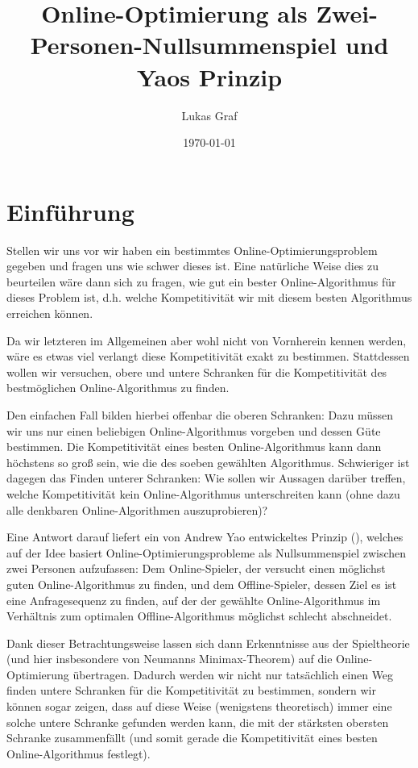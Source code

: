 \documentclass[a4paper,ngerman,12pt,bibtotoc]{scrartcl}
\theoremstyle{definition}
\theoremstyle{plain}
\theoremstyle{remark}
\renewcommand{\_}{\mathpunct{.}\,}
\newcommand{\?}{\,{:}\,}
\newcommand{\ZPNS}{Zwei-Personen-Nullsummenspiel }
\begin{document}
	\author{Lukas Graf}
	\title{Online-Optimierung als \ZPNS und Yaos Prinzip}
	\date{\today}
	
	\thispagestyle{empty}
	
	\maketitle

	\section*{Einführung}
	
	Stellen wir uns vor wir haben ein bestimmtes Online-Optimierungsproblem gegeben und fragen uns wie \glqq schwer\grqq{} dieses ist. Eine natürliche Weise dies zu beurteilen wäre dann sich zu fragen, wie gut ein bester Online-Algorithmus für dieses Problem ist, d.h. welche Kompetitivität wir mit diesem besten Algorithmus erreichen können.
	
	Da wir letzteren im Allgemeinen aber wohl nicht von Vornherein kennen werden, wäre es etwas viel verlangt diese Kompetitivität exakt zu bestimmen. Stattdessen wollen wir versuchen, obere und untere Schranken für die Kompetitivität des bestmöglichen Online-Algorithmus zu finden. 
	
	Den einfachen Fall bilden hierbei offenbar die oberen Schranken: Dazu müssen wir uns nur einen beliebigen Online-Algorithmus vorgeben und dessen Güte bestimmen. Die Kompetitivität eines besten Online-Algorithmus kann dann höchstens so groß sein, wie die des soeben gewählten Algorithmus. Schwieriger ist dagegen das Finden unterer Schranken: Wie sollen wir Aussagen darüber treffen, welche Kompetitivität kein Online-Algorithmus unterschreiten kann (ohne dazu alle denkbaren Online-Algorithmen auszuprobieren)?
	
	Eine Antwort darauf liefert ein von Andrew Yao entwickeltes Prinzip (\cite*[Theorem 1]{Yao}), welches auf der Idee basiert Online-Optimierungsprobleme als Nullsummenspiel zwischen zwei Personen aufzufassen: Dem Online-Spieler, der versucht einen möglichst guten Online-Algorithmus zu finden, und dem Offline-Spieler, dessen Ziel es ist eine Anfragesequenz zu finden, auf der der gewählte Online-Algorithmus im Verhältnis zum optimalen Offline-Algorithmus möglichst schlecht abschneidet.
	
	Dank dieser Betrachtungsweise lassen sich dann Erkenntnisse aus der Spieltheorie (und hier insbesondere von Neumanns Minimax-Theorem) auf die Online-Optimierung übertragen. Dadurch werden wir nicht nur tatsächlich einen Weg finden untere Schranken für die Kompetitivität zu bestimmen, sondern wir können sogar zeigen, dass auf diese Weise (wenigstens theoretisch) immer eine solche untere Schranke gefunden werden kann, die mit der stärksten obersten Schranke zusammenfällt (und somit gerade die Kompetitivität eines besten Online-Algorithmus festlegt).
	
\end{document}
